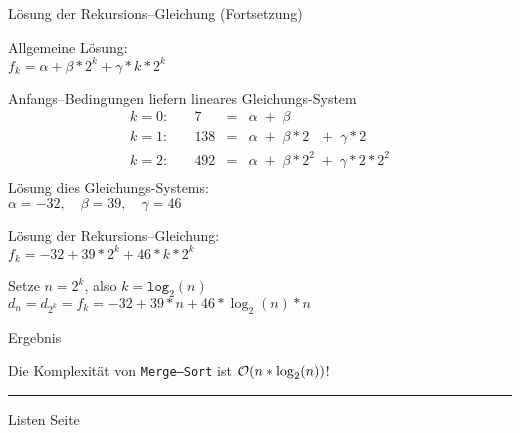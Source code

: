 
\begin{slide}{}
\normalsize

\begin{center}
L\"osung der Rekursions--Gleichung (Fortsetzung)
\end{center}
\vspace*{0.5cm}

\footnotesize
Allgemeine L\"osung: \\[0.3cm]
\hspace*{1.3cm} $f_k = \alpha + \beta * 2^k + \gamma * k * 2^k$

Anfangs--Bedingungen liefern lineares Gleichungs-System 
$$
\begin{array}{lrcl}
 k = 0:\quad &   7 & = & \alpha \;+\; \beta \\
 k = 1:\quad & 138 & = & \alpha \;+\; \beta * 2 \,\;\;+\; \gamma * 2 \\
 k = 2:\quad & 492 & = & \alpha \;+\; \beta * 2^2 \;+\; \gamma * 2 * 2^2 \\
\end{array}
$$
L\"osung dies Gleichungs-Systems: \\[0.3cm]
\hspace*{1.3cm} $\alpha = -32, \quad \beta = 39, \quad \gamma = 46$

L\"osung der Rekursions--Gleichung: \\[0.3cm]
\hspace*{1.3cm} $f_k = -32 + 39 * 2^k + 46 * k * 2^k$

Setze $n = 2^k$, also $k = \mathtt{log}_2(n)$ \\[0.3cm]
\hspace*{1.3cm} $d_n = d_{2^k} = f_k = -32 + 39 * n + 46 * \log_2(n) * n$

Ergebnis \\[0.3cm]
\hspace*{3.3cm} 
\vspace*{0.5cm}

Die Komplexit\"at von \texttt{Merge--Sort} ist $\mathcal{O}(n * \log_2(n))$!

\vspace*{\fill}
\tiny \addtocounter{mypage}{1}
\rule{17cm}{1mm}
Listen  \hspace*{\fill} Seite 
\end{slide}


